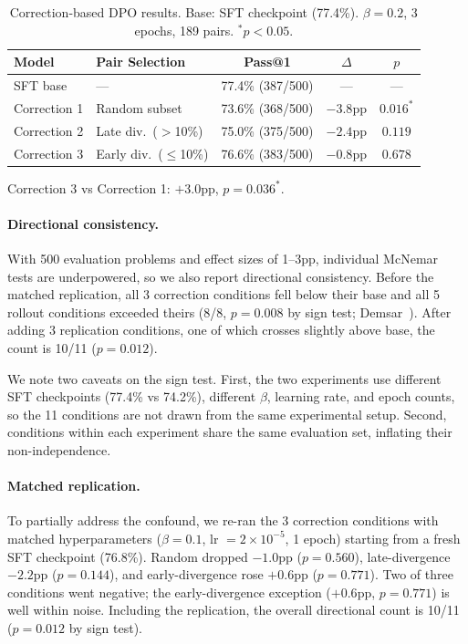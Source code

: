 \documentclass{article}
\begin{document}
\begin{table}[t]
    \centering
    \caption{Correction-based DPO results. Base: SFT checkpoint (77.4\%). $\beta = 0.2$, 3 epochs, 189 pairs. $^*p < 0.05$.}
    \vspace{0.5em}
    \begin{tabular}{llccc}
        \toprule
        Model & Pair Selection & Pass@1 & $\Delta$ & $p$ \\
        \midrule
        SFT base & --- & 77.4\% (387/500) & --- & --- \\
        Correction 1 & Random subset & 73.6\% (368/500) & $-3.8$pp & $0.016^*$ \\
        Correction 2 & Late div.\ ($>$10\%) & 75.0\% (375/500) & $-2.4$pp & $0.119$ \\
        Correction 3 & Early div.\ ($\leq$10\%) & 76.6\% (383/500) & $-0.8$pp & $0.678$ \\
        \bottomrule
    \end{tabular}
    \label{tab:correction}
    \vspace{0.3em}
    {\small Correction 3 vs Correction 1: $+3.0$pp, $p = 0.036^*$.}
\end{table}

\paragraph{Directional consistency.}

With 500 evaluation problems and effect sizes of 1--3pp, individual McNemar tests are underpowered, so we also report directional consistency.
Before the matched replication, all 3 correction conditions fell below their base and all 5 rollout conditions exceeded theirs (8/8, $p = 0.008$ by sign test; Demsar~\cite{demsar2006}).
After adding 3 replication conditions, one of which crosses slightly above base, the count is 10/11 ($p = 0.012$).

We note two caveats on the sign test.
First, the two experiments use different SFT checkpoints (77.4\% vs 74.2\%), different $\beta$, learning rate, and epoch counts, so the 11 conditions are not drawn from the same experimental setup.
Second, conditions within each experiment share the same evaluation set, inflating their non-independence.

\paragraph{Matched replication.}
To partially address the confound, we re-ran the 3 correction conditions with matched hyperparameters ($\beta = 0.1$, lr $= 2 \times 10^{-5}$, 1 epoch) starting from a fresh SFT checkpoint (76.8\%).
Random dropped $-1.0$pp ($p = 0.560$), late-divergence $-2.2$pp ($p = 0.144$), and early-divergence rose $+0.6$pp ($p = 0.771$).
Two of three conditions went negative; the early-divergence exception ($+0.6$pp, $p = 0.771$) is well within noise.
Including the replication, the overall directional count is 10/11 ($p = 0.012$ by sign test).
\end{document}
